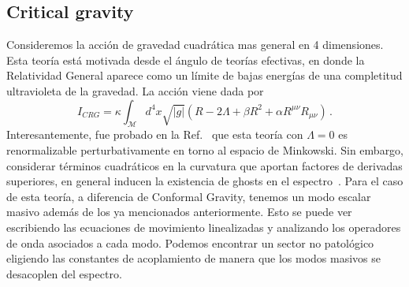 \documentclass[../Main.tex]{subfiles}
\begin{document}
\subsection{Critical gravity}\label{sec:Critical}
Consideremos la acción de gravedad cuadrática mas general en 4 dimensiones. Esta teoría está motivada desde el ángulo de teorías efectivas, en donde la Relatividad General aparece como un límite de bajas energías de una completitud ultravioleta de la gravedad. La acción viene dada por
\begin{equation}
     I_{CRG}=\kappa\int_{\mathcal{M}} d^{4}x \sqrt{\lvert g\rvert} \left(R-2\Lambda +\beta R^2 +\alpha R^{\mu\nu}R_{\mu\nu}\right) \, .\label{ICRG}
\end{equation}
Interesantemente, fue probado en la Ref.~\cite{Stelle:1976gc} que esta teoría con $\Lambda=0$ es renormalizable perturbativamente en torno al espacio de Minkowski. Sin embargo, considerar términos cuadráticos en la curvatura que aportan factores de derivadas superiores, en general inducen la existencia de ghosts en el espectro~\cite{Stelle:1976gc}. Para el caso de esta teoría, a diferencia de Conformal Gravity, tenemos un modo escalar masivo además de los ya mencionados anteriormente. Esto se puede ver escribiendo las ecuaciones de movimiento linealizadas y analizando los operadores de onda asociados a cada modo. Podemos encontrar un sector no patológico eligiendo las constantes de acoplamiento de manera que los modos masivos se desacoplen del espectro.
\end{document}
